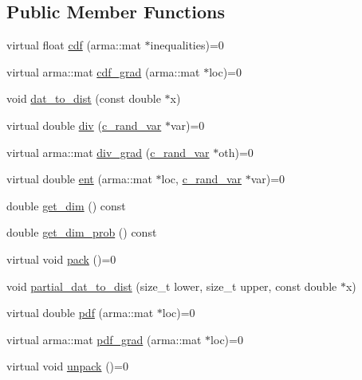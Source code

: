 \subsection*{\-Public \-Member \-Functions}
\begin{DoxyCompactItemize}
\item 
virtual float \hyperlink{classdivopt_1_1c__rand__var_ab69e1781b6d2502a893cfa932ef5244d}{cdf} (arma\-::mat $\ast$inequalities)=0
\item 
virtual arma\-::mat \hyperlink{classdivopt_1_1c__rand__var_a98aad18751922552e96d1808745b34d6}{cdf\-\_\-grad} (arma\-::mat $\ast$loc)=0
\item 
void \hyperlink{classdivopt_1_1c__rand__var_a45fac8707b07c02eb2e6ea0fff47994a}{dat\-\_\-to\-\_\-dist} (const double $\ast$x)
\item 
virtual double \hyperlink{classdivopt_1_1c__rand__var_a921fa0ba7a22c97cc0594888d221e379}{div} (\hyperlink{classdivopt_1_1c__rand__var}{c\-\_\-rand\-\_\-var} $\ast$var)=0
\item 
virtual arma\-::mat \hyperlink{classdivopt_1_1c__rand__var_a88c4e86c9ee59bd5a93a59e57442ec5c}{div\-\_\-grad} (\hyperlink{classdivopt_1_1c__rand__var}{c\-\_\-rand\-\_\-var} $\ast$oth)=0
\item 
virtual double \hyperlink{classdivopt_1_1c__rand__var_a8671b4803b5b589eed65f8c2c4008dff}{ent} (arma\-::mat $\ast$loc, \hyperlink{classdivopt_1_1c__rand__var}{c\-\_\-rand\-\_\-var} $\ast$var)=0
\item 
double \hyperlink{classdivopt_1_1c__rand__var_ae2463f769d55c59961d9a82e8ef318b2}{get\-\_\-dim} () const 
\item 
double \hyperlink{classdivopt_1_1c__rand__var_aef27f4c3b3b2f9a77d7ee6576c064525}{get\-\_\-dim\-\_\-prob} () const 
\item 
virtual void \hyperlink{classdivopt_1_1c__rand__var_a5dfd6f96919dc469f93d6d4341cb4cd2}{pack} ()=0
\item 
void \hyperlink{classdivopt_1_1c__rand__var_a5ddef49beaa10e3dfd0e6e58af104c19}{partial\-\_\-dat\-\_\-to\-\_\-dist} (size\-\_\-t lower, size\-\_\-t upper, const double $\ast$x)
\item 
virtual double \hyperlink{classdivopt_1_1c__rand__var_a631139ddccf1de90af2b8cb9a7f6d50a}{pdf} (arma\-::mat $\ast$loc)=0
\item 
virtual arma\-::mat \hyperlink{classdivopt_1_1c__rand__var_a6fa8732f6467cfb9b71b9590c2f88e5b}{pdf\-\_\-grad} (arma\-::mat $\ast$loc)=0
\item 
virtual void \hyperlink{classdivopt_1_1c__rand__var_af2b87125538d2ccf2fd427d104c5397d}{unpack} ()=0
\end{DoxyCompactItemize}

